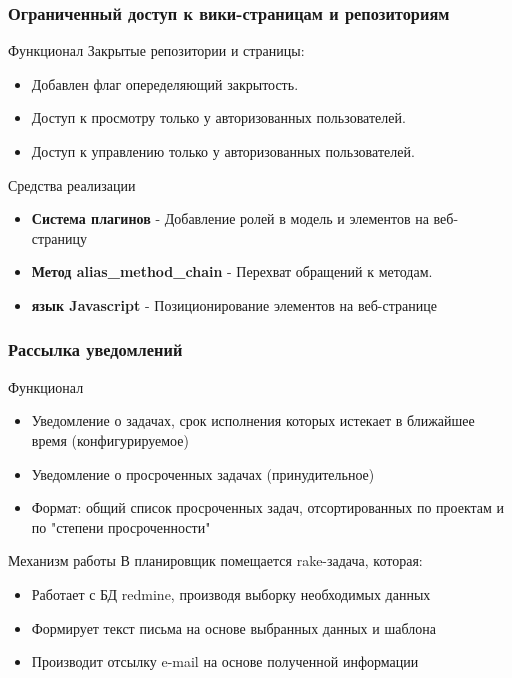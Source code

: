 \documentclass[unicode]{beamer}
\begin{document}
\begin{frame}
\transwipe[direction=90]
\frametitle{Ограниченный доступ к вики-страницам и репозиториям}
\begin{block}{Функционал}
Закрытые репозитории и страницы:
\begin{itemize}
  \item Добавлен флаг опеределяющий закрытость.
  \item Доступ к просмотру только у авторизованных пользователей.
  \item Доступ к управлению только у авторизованных пользователей.
\end{itemize}
\end{block}
\begin{block}{Средства реализации}
\begin{itemize}
  \item \textbf{Система плагинов} - Добавление ролей в модель и элементов на веб-страницу
   \item \textbf{Метод alias\_method\_chain}  - Перехват обращений к методам.
   \item \textbf{язык Javascript} - Позиционирование элементов на веб-странице
 \end{itemize}
\end{block}
\end{frame}

\begin{frame}
\transwipe[direction=90]
\frametitle{Рассылка уведомлений}
\begin{block}{Функционал}
\begin{itemize}
  \item Уведомление о задачах, срок исполнения которых истекает в ближайшее время (конфигурируемое)
  \item Уведомление о просроченных задачах (принудительное)
  \item Формат: общий список просроченных задач, отсортированных по проектам и по "степени просроченности"
\end{itemize}
\end{block}
\begin{block}{Механизм работы}
В планировщик помещается rake-задача, которая:
\begin{itemize}
  \item Работает с БД redmine, производя выборку необходимых данных
  \item Формирует текст письма на основе выбранных данных и шаблона
  \item Производит отсылку e-mail на основе полученной информации
\end{itemize}
\end{block}
\end{frame}
\end{document}

